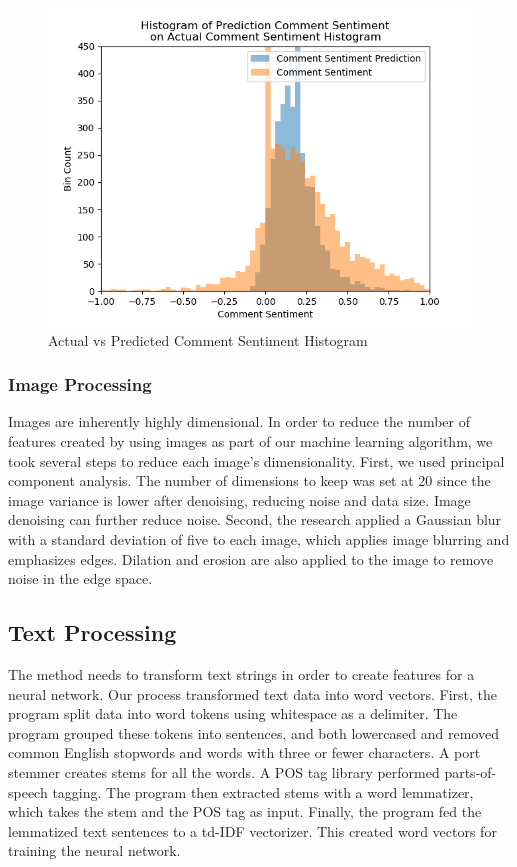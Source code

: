 \documentclass{article}
\begin{document}
\begin{figure}
\centering
\includegraphics[width=\columnwidth]{images/Sentiment_Prediction_vs_Actual.png}
\caption{Actual vs Predicted Comment Sentiment Histogram}
\label{comment_sentiment_histogram}
\end{figure}

\subsubsection{Image Processing}
Images are inherently highly dimensional. In order to reduce the number of features created by using images as part of our machine learning algorithm, we took several steps to reduce each image’s dimensionality. First, we used principal component analysis. The number of dimensions to keep was set at 20 since the image variance is lower after denoising, reducing noise and data size. Image denoising can further reduce noise. Second, the research applied a Gaussian blur with a standard deviation of five to each image, which applies image blurring and emphasizes edges. Dilation and erosion are also applied to the image to remove noise in the edge space.

\subsection{Text Processing}
The method needs to transform text strings in order to create features for a neural network. Our process transformed text data into word vectors. First, the program split data into word tokens using whitespace as a delimiter. The program grouped these tokens into sentences, and both lowercased and removed common English stopwords and words with three or fewer characters. A port stemmer creates stems for all the words. A POS tag library performed parts-of-speech tagging. The program then extracted stems with a word lemmatizer, which takes the stem and the POS tag as input. Finally, the program fed the lemmatized text sentences to a td-IDF vectorizer. This created word vectors for training the neural network.
\end{document}
